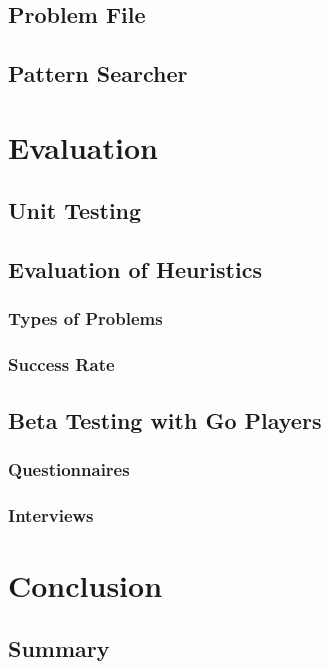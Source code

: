 \documentclass{l4proj}
\begin{document}
\section{Problem File}

\section{Pattern Searcher}








\chapter{Evaluation}

\section{Unit Testing}

\section{Evaluation of Heuristics}
\subsection{Types of Problems}
\subsection{Success Rate}

\section{Beta Testing with Go Players}
\subsection{Questionnaires}
\subsection{Interviews}






\chapter{Conclusion}

\section{Summary}
\end{document}
